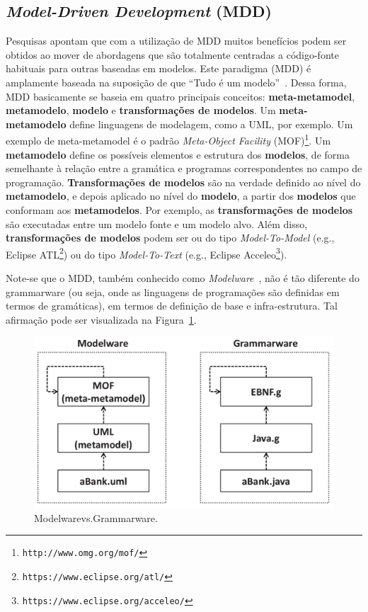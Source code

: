 \subsection{\textit{Model-Driven Development} (MDD)}\label{sec:model_driven_development}

Pesquisas apontam que com a utilização de MDD muitos benefícios podem ser obtidos ao mover de abordagens que são totalmente centradas a código-fonte habituais para outras baseadas em modelos. Este paradigma (MDD) é amplamente baseada na suposição de que ``Tudo é um modelo''~\citep{On_the_unification_power_of_models}. Dessa forma, MDD basicamente se baseia em quatro principais conceitos: \textbf{meta-metamodel}, \textbf{metamodelo}, \textbf{modelo} e \textbf{transformações de modelos}. Um \textbf{meta-metamodelo} define linguagens de modelagem, como a UML, por exemplo. Um exemplo de meta-metamodel é o padrão \textit{Meta-Object Facility} (MOF)\footnote{\texttt{http://www.omg.org/mof/}}. Um \textbf{metamodelo} define os possíveis elementos e estrutura dos \textbf{modelos}, de forma semelhante à relação entre a gramática e programas correspondentes no campo de programação. \textbf{Transformações de modelos} são na verdade definido ao nível do \textbf{metamodelo}, e depois aplicado no nível do \textbf{modelo}, a partir dos \textbf{modelos} que conformam aos \textbf{metamodelos}. Por exemplo, as \textbf{transformações de modelos} são executadas entre um modelo fonte e um modelo alvo. Além disso, \textbf{transformações de modelos} podem ser ou do tipo \textit{Model-To-Model} (e.g., Eclipse ATL\footnote{\texttt{https://www.eclipse.org/atl/}}) ou do tipo \textit{Model-To-Text} (e.g., Eclipse Acceleo\footnote{\texttt{https://www.eclipse.org/acceleo/}}).

Note-se que o MDD, também conhecido como \textit{Modelware}~\citep{OMGMDD}, não é tão diferente do grammarware (ou seja, onde as linguagens de programações são definidas em termos de gramáticas), em termos de definição de base e infra-estrutura. Tal afirmação pode ser visualizada na Figura~\ref{fig:modelWareVsGrammarWare}. 

\begin{figure}[!ht]
\centering
  \includegraphics[scale=0.25]{figuras/modelWareVSGrammarWare}
\caption{Modelwarevs.Grammarware.}
\label{fig:modelWareVsGrammarWare}
\end{figure}

